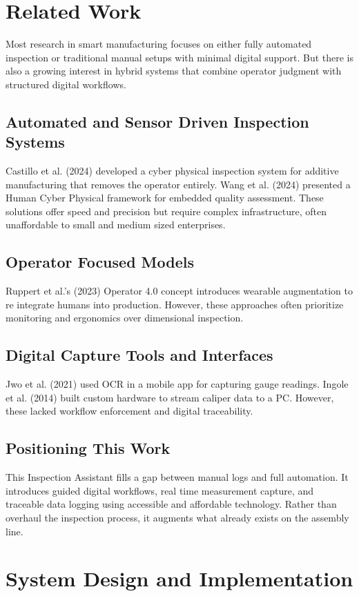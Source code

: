 \documentclass[conference]{IEEEtran}
\begin{document}
\section{Related Work}
Most research in smart manufacturing focuses on either fully automated inspection or traditional manual setups with minimal digital support. But there is also a growing interest in hybrid systems that combine operator judgment with structured digital workflows.

\subsection{Automated and Sensor Driven Inspection Systems}
Castillo et al. (2024) developed a cyber physical inspection system for additive manufacturing that removes the operator entirely. Wang et al. (2024) presented a Human Cyber Physical framework for embedded quality assessment. These solutions offer speed and precision but require complex infrastructure, often unaffordable to small and medium sized enterprises.

\subsection{Operator Focused Models}
Ruppert et al.'s (2023) Operator 4.0 concept introduces wearable augmentation to re integrate humans into production. However, these approaches often prioritize monitoring and ergonomics over dimensional inspection.

\subsection{Digital Capture Tools and Interfaces}
Jwo et al. (2021) used OCR in a mobile app for capturing gauge readings. Ingole et al. (2014) built custom hardware to stream caliper data to a PC. However, these lacked workflow enforcement and digital traceability.

\subsection{Positioning This Work}
This Inspection Assistant fills a gap between manual logs and full automation. It introduces guided digital workflows, real time measurement capture, and traceable data logging using accessible and affordable technology. Rather than overhaul the inspection process, it augments what already exists on the assembly line.
\section{System Design and Implementation}
\end{document}

